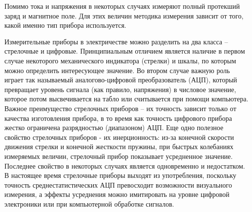 Помимо тока и напряжения в некоторых случаях измеряют полный протекший заряд и магнитное поле. Для этих величин методика измерения зависит от того, какой именно тип прибора используется.

Измерительные приборы в электричестве можно разделить на два класса -- стрелочные и цифровые. Принципиальным отличием является наличие в первом случае некоторого механического индикатора (стрелки) и шкалы, по которым можно определить интересующее значение. Во втором случае важную роль играет так называемый аналогово-цифровой преобразователь (АЦП), который превращает уровень сигнала (как правило, напряжения) в числовое значение, которое потом высвечивается на табло или считывается при помощи компьютера. Важное преимущество стрелочных приборов -- их точность зависит только от качества изготовления прибора, в то время как точность цифрового прибора жестко ограничена разрядностью (диапазоном) АЦП. Еще одно полезное свойство стрелочных приборов - их инерционность: из-за конечной скорости движения стрелки и конечной жесткости пружины, при быстрых колебаниях измеряемых величин, стрелочный прибор показывает усредненное значение. Последнее свойство в некоторых случаях является одновременно и недостатком. В настоящее время стрелочные приборы выходят из употребления, поскольку точность среднестатистических АЦП превосходит возможности визуального измерения, а эффекты усреднения можно имитировать на уровне цифровой электроники или при компьютерной обработке сигналов.